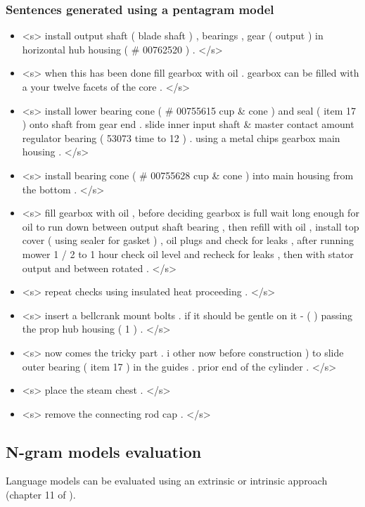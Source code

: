 \subsubsection{Sentences generated using a pentagram model}\label{subsec:pentagram-sentences}

\begin{itemize}
	\item <s> install output shaft ( blade shaft ) , bearings , gear ( output ) in horizontal hub housing ( \# 00762520 ) . </s>
	\item <s> when this has been done fill gearbox with oil . gearbox can be filled with a your twelve facets of the core . </s>
	\item <s> install lower bearing cone ( \# 00755615 cup \& cone ) and seal ( item 17 ) onto shaft from gear end . slide inner input shaft \& master contact amount regulator bearing ( 53073 time to 12 ) . using a metal chips gearbox main housing . </s>
	\item <s> install bearing cone ( \# 00755628 cup \& cone ) into main housing from the bottom . </s>
	\item <s> fill gearbox with oil , before deciding gearbox is full wait long enough for oil to run down between output shaft bearing , then refill with oil , install top cover ( using sealer for gasket ) , oil plugs and check for leaks , after running mower 1 / 2 to 1 hour check oil level and recheck for leaks , then with stator output and between rotated . </s>
	\item <s> repeat checks using insulated heat proceeding . </s>
	\item <s> insert a bellcrank mount bolts . if it should be gentle on it - ( ) passing the prop hub housing ( 1 ) . </s>
	\item <s> now comes the tricky part . i other now before construction ) to slide outer bearing ( item 17 ) in the guides . prior end of the cylinder . </s>
	\item <s> place the steam chest . </s>
	\item <s> remove the connecting rod cap . </s>
\end{itemize}



\subsection{N-gram models evaluation}

Language models can be evaluated using an extrinsic or intrinsic approach (chapter 11 of \cite{Clark2010}).

